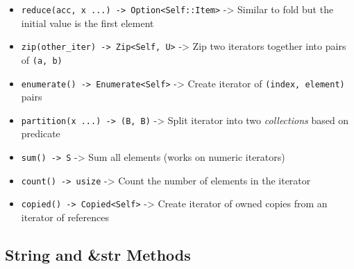 \documentclass[
  11pt,
]{article}
\begin{document}
\begin{itemize}
  -\textgreater{} Initialize accumulator to \texttt{init}, execute
  closure on each element
\item
  \texttt{reduce(\textbar{}acc,\ x\textbar{}\ ...)\ -\textgreater{}\ Option\textless{}Self::Item\textgreater{}}
  -\textgreater{} Similar to fold but the initial value is the first
  element
\item
  \texttt{zip(other\_iter)\ -\textgreater{}\ Zip\textless{}Self,\ U\textgreater{}}
  -\textgreater{} Zip two iterators together into pairs of
  \texttt{(a,\ b)}
\item
  \texttt{enumerate()\ -\textgreater{}\ Enumerate\textless{}Self\textgreater{}}
  -\textgreater{} Create iterator of \texttt{(index,\ element)} pairs
\item
  \texttt{partition(\textbar{}x\textbar{}\ ...)\ -\textgreater{}\ (B,\ B)}
  -\textgreater{} Split iterator into two \emph{collections} based on
  predicate
\item
  \texttt{sum()\ -\textgreater{}\ S} -\textgreater{} Sum all elements
  (works on numeric iterators)
\item
  \texttt{count()\ -\textgreater{}\ usize} -\textgreater{} Count the
  number of elements in the iterator
\item
  \texttt{copied()\ -\textgreater{}\ Copied\textless{}Self\textgreater{}}
  -\textgreater{} Create iterator of owned copies from an iterator of
  references
\end{itemize}

\subsection{String and \&str Methods}\label{string-and-str-methods}
\end{document}
